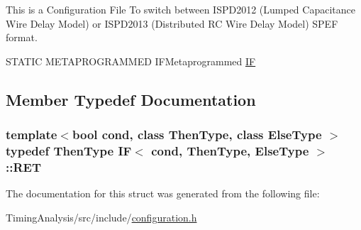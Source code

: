 This is a Configuration File To switch between I\-S\-P\-D2012 (Lumped Capacitance Wire Delay Model) or I\-S\-P\-D2013 (Distributed R\-C Wire Delay Model) S\-P\-E\-F format. 

S\-T\-A\-T\-I\-C M\-E\-T\-A\-P\-R\-O\-G\-R\-A\-M\-M\-E\-D I\-F\-Metaprogrammed \hyperlink{structIF}{I\-F} 

\subsection{Member Typedef Documentation}
\hypertarget{structIF_af93da5fd47eed555ff23c8d9022f8212}{
\subsubsection[{R\-E\-T}]{\setlength{\rightskip}{0pt plus 5cm}template$<$bool cond, class Then\-Type, class Else\-Type $>$ typedef Then\-Type {\bf I\-F}$<$ cond, Then\-Type, Else\-Type $>$\-::{\bf R\-E\-T}}}\label{structIF_af93da5fd47eed555ff23c8d9022f8212}


The documentation for this struct was generated from the following file\-:\begin{DoxyCompactItemize}
\item 
Timing\-Analysis/src/include/\hyperlink{configuration_8h}{configuration.\-h}\end{DoxyCompactItemize}
